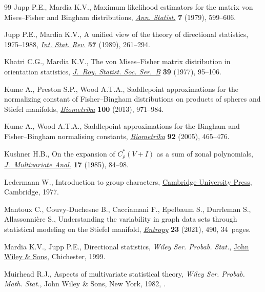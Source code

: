\documentclass[pdftex]{sigma}
\numberwithin{equation}{section}
\begin{document}
\begin{thebibliography}{99}
Jupp P.E., Mardia K.V., Maximum likelihood estimators for the matrix von
 {M}ises--{F}isher and {B}ingham distributions, \href{https://doi.org/10.1214/aos/1176344681}{\textit{Ann. Statist.}}
 \textbf{7} (1979), 599--606.

Jupp P.E., Mardia K.V., A unified view of the theory of directional statistics,
 1975--1988, \href{https://doi.org/10.2307/1403799}{\textit{Int. Stat. Rev.}} \textbf{57} (1989), 261--294.

Khatri C.G., Mardia K.V., The von {M}ises--{F}isher matrix distribution in
 orientation statistics, \href{https://doi.org/10.1111/j.2517-6161.1977.tb01610.x}{\textit{J.~Roy. Statist. Soc. Ser.~B}} \textbf{39}
 (1977), 95--106.

Kume A., Preston S.P., Wood A.T.A., Saddlepoint approximations for the
 normalizing constant of {F}isher--{B}ingham distributions on products of
 spheres and {S}tiefel manifolds, \href{https://doi.org/10.1093/biomet/ast021}{\textit{Biometrika}} \textbf{100} (2013),
 971--984.

Kume A., Wood A.T.A., Saddlepoint approximations for the {B}ingham and
 {F}isher--{B}ingham normalising constants, \href{https://doi.org/10.1093/biomet/92.2.465}{\textit{Biometrika}} \textbf{92}
 (2005), 465--476.

Kushner H.B., On the expansion of {$C^*_\rho(V+I)$} as a sum of zonal
 polynomials, \href{https://doi.org/10.1016/0047-259X(85)90096-X}{\textit{J.~Multivariate Anal.}} \textbf{17} (1985), 84--98.

Ledermann W., Introduction to group characters, \href{https://doi.org/10.1017/CBO9780511565755}{Cambridge University Press},
 Cambridge, 1977.

Mantoux C., Couvy-Duchesne B., Cacciamani F., Epelbaum S., Durrleman S.,
 Allassonni\`ere S., Understanding the variability in graph data sets through
 statistical modeling on the {S}tiefel manifold, \href{https://doi.org/10.3390/e23040490}{\textit{Entropy}} \textbf{23}
 (2021), 490, 34~pages.

Mardia K.V., Jupp P.E., Directional statistics, \textit{Wiley Ser. Probab. Stat.}, \href{https://doi.org/10.1002/9780470316979}{John
 Wiley \& Sons}, Chichester, 1999.

Muirhead R.J., Aspects of multivariate statistical theory, \textit{Wiley Ser. Probab. Math. Stat.}, John Wiley \& Sons, New York, 1982,
 .


\end{thebibliography}
\end{document}
